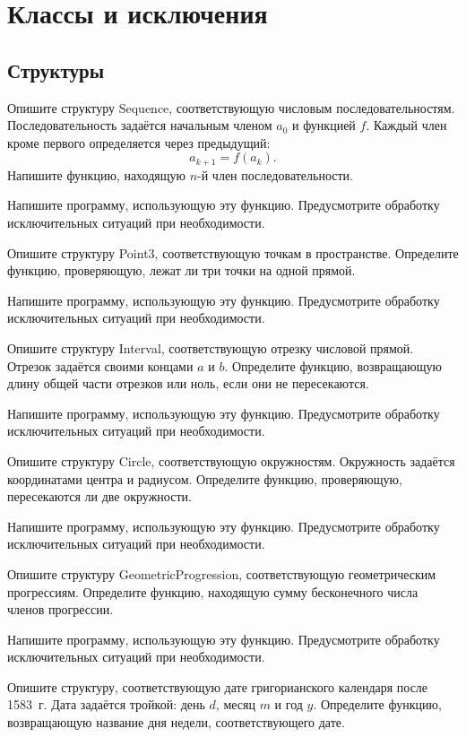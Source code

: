 \section{Классы и исключения}

\subsection{Структуры}

\task Опишите структуру Sequence, соответствующую числовым
последовательностям. Последовательность задаётся начальным членом
$a_0$ и функцией $f$. Каждый член кроме первого определяется через
предыдущий:
\[
a_{k+1} = f(a_k).
\]
Напишите функцию, находящую $n$-й член последовательности.

Напишите программу, использующую эту функцию. Предусмотрите обработку
исключительных ситуаций при необходимости.

\task Опишите структуру Point3, соответствующую точкам в
пространстве. Определите функцию, проверяющую, лежат ли три точки на
одной прямой.

Напишите программу, использующую эту функцию. Предусмотрите обработку
исключительных ситуаций при необходимости.

\task Опишите структуру Interval, соответствующую отрезку числовой
прямой. Отрезок задаётся своими концами $a$ и $b.$ Определите функцию,
возвращающую длину общей части отрезков или ноль, если они не
пересекаются.

Напишите программу, использующую эту функцию. Предусмотрите обработку
исключительных ситуаций при необходимости.

\task Опишите структуру Circle, соответствующую
окружностям. Окружность задаётся координатами центра и
радиусом. Определите функцию, проверяющую, пересекаются ли две
окружности.

Напишите программу, использующую эту функцию. Предусмотрите обработку
исключительных ситуаций при необходимости.

\task Опишите структуру GeometricProgression, соответствующую
геометрическим прогрессиям. Определите функцию, находящую сумму
бесконечного числа членов прогрессии.

Напишите программу, использующую эту функцию. Предусмотрите обработку
исключительных ситуаций при необходимости.

\task Опишите структуру, соответствующую дате григорианского календаря
после 1583~г. Дата задаётся тройкой: день $d$, месяц $m$ и год $y.$
Определите функцию, возвращающую название дня недели, соответствующего
дате.

